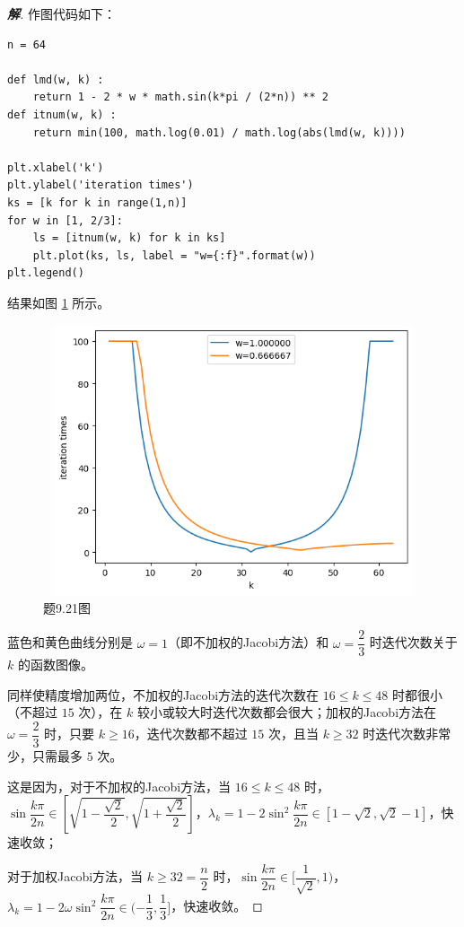 \documentclass{ctexart}
\newenvironment{sol}{\begin{proof}[\bf 解]}{\end{proof}}
\begin{document}
\begin{sol}
作图代码如下：
\begin{lstlisting}
n = 64

def lmd(w, k) :
    return 1 - 2 * w * math.sin(k*pi / (2*n)) ** 2
def itnum(w, k) :
    return min(100, math.log(0.01) / math.log(abs(lmd(w, k))))

plt.xlabel('k')
plt.ylabel('iteration times')
ks = [k for k in range(1,n)]
for w in [1, 2/3]:
    ls = [itnum(w, k) for k in ks]
    plt.plot(ks, ls, label = "w={:f}".format(w))
plt.legend()
\end{lstlisting}

结果如图 \ref{9.21-fig1} 所示。

\begin{figure}[h]
    \centering
	\includegraphics[width = 12cm, height = 8cm]{21.png}
    \caption{题9.21图}
	\label{9.21-fig1}
\end{figure}

蓝色和黄色曲线分别是 $\omega=1$（即不加权的Jacobi方法）和 $\omega=\dfrac 23$ 时迭代次数关于 $k$ 的函数图像。

同样使精度增加两位，不加权的Jacobi方法的迭代次数在 $16\leq k\leq 48$ 时都很小（不超过 $15$ 次），在 $k$ 较小或较大时迭代次数都会很大；加权的Jacobi方法在 $\omega=\dfrac 23$ 时，只要 $k\geq 16$，迭代次数都不超过 $15$ 次，且当 $k\geq 32$ 时迭代次数非常少，只需最多 $5$ 次。

这是因为，对于不加权的Jacobi方法，当 $16\leq k\leq 48$ 时，$\sin\dfrac{k\pi}{2n}\in[\sqrt{1-\dfrac{\sqrt 2}2},\sqrt{1+\dfrac{\sqrt 2}2}]$，$\lambda_k = 1-2\sin^2\dfrac{k\pi}{2n}\in [1-\sqrt 2, \sqrt 2-1]$，快速收敛；

对于加权Jacobi方法，当 $k\geq 32=\dfrac n2$ 时，$\sin\dfrac{k\pi}{2n}\in[\dfrac 1{\sqrt 2},1)$，$\lambda_k = 1-2\omega\sin^2\dfrac{k\pi}{2n} \in (-\dfrac 13,\dfrac 13]$，快速收敛。

\end{sol}
\end{document}
